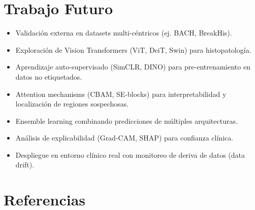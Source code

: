 \documentclass[12pt,a4paper]{article}
\begin{document}
\section{Trabajo Futuro}

\begin{itemize}
    \item Validación externa en datasets multi-céntricos (ej. BACH, BreakHis).
    \item Exploración de Vision Transformers (ViT, DeiT, Swin) para histopatología.
    \item Aprendizaje auto-supervisado (SimCLR, DINO) para pre-entrenamiento en datos no etiquetados.
    \item Attention mechanisms (CBAM, SE-blocks) para interpretabilidad y localización de regiones sospechosas.
    \item Ensemble learning combinando predicciones de múltiples arquitecturas.
    \item Análisis de explicabilidad (Grad-CAM, SHAP) para confianza clínica.
    \item Despliegue en entorno clínico real con monitoreo de deriva de datos (data drift).
\end{itemize}

\section*{Referencias}
\end{document}
